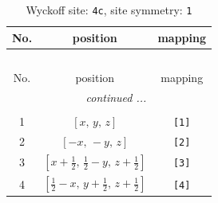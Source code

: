 \documentclass[fleqn,8pt]{jsarticle}
\begin{document}
\renewcommand{\arraystretch}{1.2}
\begin{longtable}{ccc}
\caption{Wyckoff site: {\tt 4c}, site symmetry: {\tt 1}}
 \\
 \hline \hline
No. & position & mapping \\ \hline \endfirsthead

\multicolumn{2}{l}{\tablename\ \thetable{}} \\
 \hline \hline
No. & position & mapping \\ \hline \endhead

 \hline \hline
\multicolumn{2}{r}{\footnotesize\it continued ...} \\ \endfoot

 \hline \hline
\multicolumn{2}{r}{} \\ \endlastfoot

1 & $\left[ x,\, y,\, z \right]$ & {\tt [1]} \\ \hline
2 & $\left[ - x,\, - y,\, z \right]$ & {\tt [2]} \\ \hline
3 & $\left[ x + \frac{1}{2},\, \frac{1}{2} - y,\, z + \frac{1}{2} \right]$ & {\tt [3]} \\ \hline
4 & $\left[ \frac{1}{2} - x,\, y + \frac{1}{2},\, z + \frac{1}{2} \right]$ & {\tt [4]} \\
\end{longtable}
\end{document}
